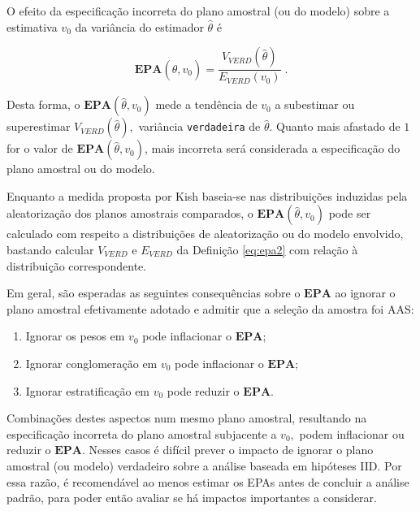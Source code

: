 \documentclass[]{book}
\theoremstyle{definition}
\theoremstyle{definition}
\theoremstyle{definition}
\theoremstyle{remark}
\let\BeginKnitrBlock\begin \let\EndKnitrBlock\end
\begin{document}
\BeginKnitrBlock{definition}
\protect\hypertarget{def:unnamed-chunk-3}{}{\label{def:unnamed-chunk-3} }O
efeito da especificação incorreta do plano amostral (ou do modelo) sobre
a estimativa \(v_{0}\) da variância do estimador \(\hat{\theta}\) é
\EndKnitrBlock{definition}

\begin{equation}
\mathbf{EPA}\left( \hat{\theta},v_{0}\right) =\frac{V_{VERD}\left(\hat{
\theta}\right) }{E_{VERD}\left( v_{0}\right) }\;.  \label{eq:epa2}
\end{equation}

Desta forma, o \(\mathbf{EPA}\left( \hat{\theta},v_{0}\right)\) mede a
tendência de \(v_{0}\) a subestimar ou superestimar
\(V_{VERD}\left( \hat{\theta}\right) ,\) variância \texttt{verdadeira}
de \(\hat{\theta}\). Quanto mais afastado de \(1\) for o valor de
\(\mathbf{EPA}\left( \hat{\theta},v_{0}\right)\), mais incorreta será
considerada a especificação do plano amostral ou do modelo.

Enquanto a medida proposta por Kish baseia-se nas distribuições
induzidas pela aleatorização dos planos amostrais comparados, o
\(\mathbf{EPA}\left( \hat{\theta},v_{0}\right)\) pode ser calculado com
respeito a distribuições de aleatorização ou do modelo envolvido,
bastando calcular \(V_{VERD}\) e \(E_{VERD}\) da Definição \eqref{eq:epa2}
com relação à distribuição correspondente.

Em geral, são esperadas as seguintes consequências sobre o
\(\mathbf{EPA}\) ao ignorar o plano amostral efetivamente adotado e
admitir que a seleção da amostra foi AAS:

\begin{enumerate}
\def\labelenumi{\arabic{enumi}.}
\item
  Ignorar os pesos em \(v_{0}\) pode inflacionar o \(\mathbf{EPA}\);
\item
  Ignorar conglomeração em \(v_{0}\) pode inflacionar o
  \(\mathbf{EPA}\);
\item
  Ignorar estratificação em \(v_{0}\) pode reduzir o \(\mathbf{EPA}\).
\end{enumerate}

Combinações destes aspectos num mesmo plano amostral, resultando na
especificação incorreta do plano amostral subjacente a \(v_{0},\) podem
inflacionar ou reduzir o \(\mathbf{EPA}\). Nesses casos é difícil prever
o impacto de ignorar o plano amostral (ou modelo) verdadeiro sobre a
análise baseada em hipóteses IID. Por essa razão, é recomendável ao
menos estimar os EPAs antes de concluir a análise padrão, para poder
então avaliar se há impactos importantes a considerar.
\end{document}
